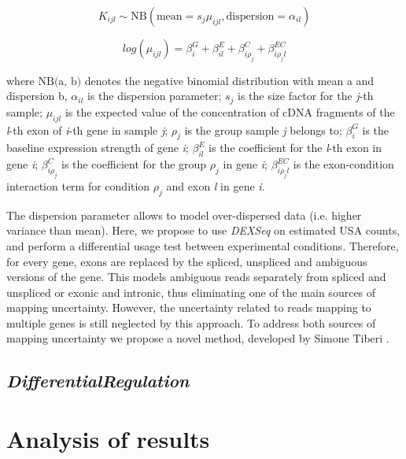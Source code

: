 \begin{equation}
K_{ijl} \sim \text{NB}(\text{mean}=s_j \mu_{ijl}, \text{dispersion}=\alpha_{il})
\label{eqn:DEXSEQ_A}
\end{equation}

\begin{equation}
log(\mu_{ijl}) = \beta^G_i + \beta^E_{il} + \beta_{i \rho_j}^C + \beta^{EC}_{i \rho_j l}
\label{eqn:DEXSEQ_B}
\end{equation}

where $\text{NB(a, b)}$ denotes the negative binomial distribution with mean a and dispersion b, $\alpha_{il}$ is the dispersion parameter; $s_j$ is the size factor for the \emph{j}-th sample; $\mu_{ijl}$ is the expected value of the concentration of cDNA fragments of the \emph{l}-th exon of \emph{i}-th gene in sample \emph{j}; $\rho_j$ is the group sample \emph{j} belongs to; $\beta^G_i$ is the baseline expression strength of gene \emph{i}; $\beta^E_{il}$ is the coefficient for the \emph{l}-th exon in gene \emph{i}; $\beta^C_{i\rho_j}$ is the coefficient for the group $\rho_j$ in gene \emph{i}; $\beta^{EC}_{i \rho_j l}$ is the exon-condition interaction term for condition $\rho_j$ and exon \emph{l} in gene \emph{i}.

The dispersion parameter allows to model over-dispersed data (i.e. higher variance than mean). Here, we propose to use \emph{DEXSeq} on estimated USA counts, and perform a differential usage test between experimental conditions. Therefore, for every gene, exons are replaced by the spliced, unspliced and ambiguous versions of the gene. This models ambiguous reads separately from spliced and unspliced or exonic and intronic, thus eliminating one of the main sources of mapping uncertainty. However, the uncertainty related to reads mapping to multiple genes is still neglected by this approach. To address both sources of mapping uncertainty we propose a novel method, developed by Simone Tiberi \citep{differential_regulation}.

\subsection{\emph{DifferentialRegulation}}

\section{Analysis of results}
